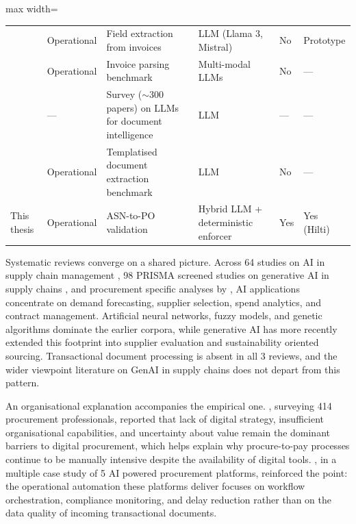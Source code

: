 \begin{table}[htbp]
\begin{adjustbox}{max width=\textwidth}
\begin{tabular}{@{}p{2.6cm}p{2.3cm}p{3.1cm}p{2.7cm}p{1.1cm}p{2.1cm}@{}}
\citet{loukil2024}        & Operational                        & Field extraction from invoices                          & LLM (Llama 3, Mistral)               & No      & Prototype                 \\
\citet{berghaus2025}      & Operational                        & Invoice parsing benchmark                               & Multi-modal LLMs                     & No      & ---                       \\
\citet{ke2025}            & ---                                & Survey ($\sim$300 papers) on LLMs for document intelligence & LLM                              & ---     & ---                       \\
\citet{hasan2025}         & Operational                        & Templatised document extraction benchmark               & LLM                                  & No      & ---                       \\
This thesis               & Operational                        & ASN-to-PO validation                                    & Hybrid LLM + deterministic enforcer  & Yes     & Yes (Hilti)               \\
\bottomrule
\end{tabular}
\end{adjustbox}
\end{table}

Systematic reviews converge on a shared picture. Across 64 studies on AI in supply chain management \citep{toorajipour2021}, 98 PRISMA screened studies on generative AI in supply chains \citep{bahroun2026}, and procurement specific analyses by \citet{guida2023}, AI applications concentrate on demand forecasting, supplier selection, spend analytics, and contract management. Artificial neural networks, fuzzy models, and genetic algorithms dominate the earlier corpora, while generative AI has more recently extended this footprint into supplier evaluation and sustainability oriented sourcing. Transactional document processing is absent in all 3 reviews, and the wider viewpoint literature on GenAI in supply chains \citep{frederico2023} does not depart from this pattern.

An organisational explanation accompanies the empirical one. \citet{bienhaus2018}, surveying 414 procurement professionals, reported that lack of digital strategy, insufficient organisational capabilities, and uncertainty about value remain the dominant barriers to digital procurement, which helps explain why procure-to-pay processes continue to be manually intensive despite the availability of digital tools. \citet{allalcherif2021}, in a multiple case study of 5 AI powered procurement platforms, reinforced the point: the operational automation these platforms deliver focuses on workflow orchestration, compliance monitoring, and delay reduction rather than on the data quality of incoming transactional documents.

